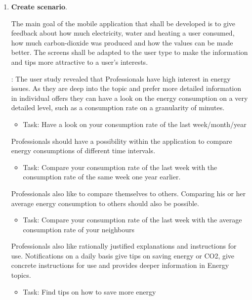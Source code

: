 \begin{enumerate}
	\item \textbf{Create scenario}.
	
	The main goal of the mobile application that shall be developed is to give feedback about how much electricity, water and heating a user consumed, how much carbon-dioxide was produced and how the values can be made better. The screens shall be adapted to the user type to make the information and tips more attractive to a user's interests.
	
	: The user study revealed that Professionals have high interest in energy issues. As they are deep into the topic and prefer more detailed information in individual offers they can have a look on the energy consumption on a very detailed level, such as a consumption rate on a granularity of minutes.
 
	\begin{itemize}
		\item Task: Have a look on your consumption rate of the last week/month/year
	\end{itemize}
	
	Professionals should have a possibility within the application to compare energy consumptions of different time intervals.
	
	\begin{itemize}
		\item Task: Compare your consumption rate of the last week with the consumption rate of the same week one year earlier.
	\end{itemize}

	Professionals also like to compare themselves to others. Comparing his or her average energy consumption to others should also be possible.
	
	\begin{itemize}
		\item Task: Compare your consumption rate of the last week with the average consumption rate of your neighbours
	\end{itemize}
	
	Professionals also like rationally justified explanations and instructions for use. Notifications on a daily basis give tips on saving energy or CO2, give concrete instructions for use and provides deeper information in Energy topics.
	
	\begin{itemize}
		\item Task: Find tips on how to save more energy
	\end{itemize}
	

\end{enumerate}
